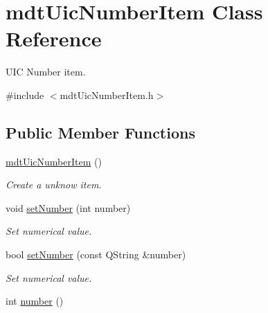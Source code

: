 \hypertarget{classmdt_uic_number_item}{
\section{mdtUicNumberItem Class Reference}
\label{classmdt_uic_number_item}
}


UIC Number item.  




{\ttfamily \#include $<$mdtUicNumberItem.h$>$}

\subsection*{Public Member Functions}
\begin{DoxyCompactItemize}
\item 
\hyperlink{classmdt_uic_number_item_a119fb789d9a5755b0243b3c4d1cab811}{mdtUicNumberItem} ()
\begin{DoxyCompactList}\small\item\em Create a unknow item. \end{DoxyCompactList}\item 
\hypertarget{classmdt_uic_number_item_ab1388f9d35e67c76bde96c522ba7388b}{
void \hyperlink{classmdt_uic_number_item_ab1388f9d35e67c76bde96c522ba7388b}{setNumber} (int number)}
\label{classmdt_uic_number_item_ab1388f9d35e67c76bde96c522ba7388b}

\begin{DoxyCompactList}\small\item\em Set numerical value. \end{DoxyCompactList}\item 
bool \hyperlink{classmdt_uic_number_item_a7880c90310850a42deaf38dbc8d91bbd}{setNumber} (const QString \&number)
\begin{DoxyCompactList}\small\item\em Set numerical value. \end{DoxyCompactList}\item 
\hypertarget{classmdt_uic_number_item_a23c0a0e1c9f20bc3e092a51a1eabbffc}{
int \hyperlink{classmdt_uic_number_item_a23c0a0e1c9f20bc3e092a51a1eabbffc}{number} ()}
\label{classmdt_uic_number_item_a23c0a0e1c9f20bc3e092a51a1eabbffc}


\end{DoxyCompactItemize}
